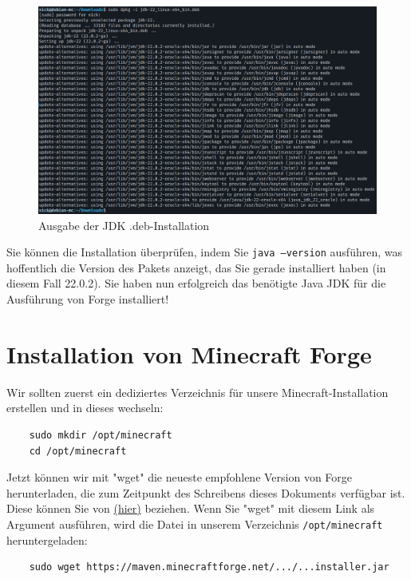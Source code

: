 \documentclass[]{article}
\begin{document}
\begin{figure}[h!]
	\caption{Ausgabe der JDK .deb-Installation}
	\centering
	\includegraphics[width=1\textwidth]{jdk-output}
\end{figure}
\FloatBarrier

Sie können die Installation überprüfen, indem Sie \texttt{java --version} ausführen, was hoffentlich die Version des Pakets anzeigt, das Sie gerade installiert haben (in diesem Fall 22.0.2). Sie haben nun erfolgreich das benötigte Java JDK für die Ausführung von Forge installiert!

\section{Installation von Minecraft Forge}

Wir sollten zuerst ein dediziertes Verzeichnis für unsere Minecraft-Installation erstellen und in dieses wechseln:

\begin{verbatim}
	sudo mkdir /opt/minecraft
	cd /opt/minecraft
\end{verbatim}

Jetzt können wir mit "wget" die neueste empfohlene Version von Forge herunterladen, die zum Zeitpunkt des Schreibens dieses Dokuments verfügbar ist. Diese können Sie von \href{https://maven.minecraftforge.net/net/minecraftforge/forge/1.20.6-50.1.0/forge-1.20.6-50.1.0-installer.jar}{(hier)} beziehen. Wenn Sie "wget" mit diesem Link als Argument ausführen, wird die Datei in unserem Verzeichnis \texttt{/opt/minecraft} heruntergeladen:

\begin{verbatim}
	sudo wget https://maven.minecraftforge.net/.../...installer.jar
\end{verbatim}
\end{document}
